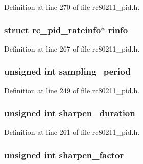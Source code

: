 Definition at line 270 of file rc80211\-\_\-pid.\-h.

\hypertarget{structrc__pid__info_a4f4b42edd508d8b67f84acfb4d10981d}{
\subsubsection[{rinfo}]{\setlength{\rightskip}{0pt plus 5cm}struct {\bf rc\-\_\-pid\-\_\-rateinfo}$\ast$ rinfo}}\label{structrc__pid__info_a4f4b42edd508d8b67f84acfb4d10981d}


Definition at line 267 of file rc80211\-\_\-pid.\-h.

\hypertarget{structrc__pid__info_ae8f25bd55b4a9f4801e99450be7d7423}{
\subsubsection[{sampling\-\_\-period}]{\setlength{\rightskip}{0pt plus 5cm}unsigned int sampling\-\_\-period}}\label{structrc__pid__info_ae8f25bd55b4a9f4801e99450be7d7423}


Definition at line 249 of file rc80211\-\_\-pid.\-h.

\hypertarget{structrc__pid__info_afabb1c822dc4b2c7064e942d6ce04690}{
\subsubsection[{sharpen\-\_\-duration}]{\setlength{\rightskip}{0pt plus 5cm}unsigned int sharpen\-\_\-duration}}\label{structrc__pid__info_afabb1c822dc4b2c7064e942d6ce04690}


Definition at line 261 of file rc80211\-\_\-pid.\-h.

\hypertarget{structrc__pid__info_a2b9d94e794aa853e15da008fe0644b64}{
\subsubsection[{sharpen\-\_\-factor}]{\setlength{\rightskip}{0pt plus 5cm}unsigned int sharpen\-\_\-factor}}\label{structrc__pid__info_a2b9d94e794aa853e15da008fe0644b64}


